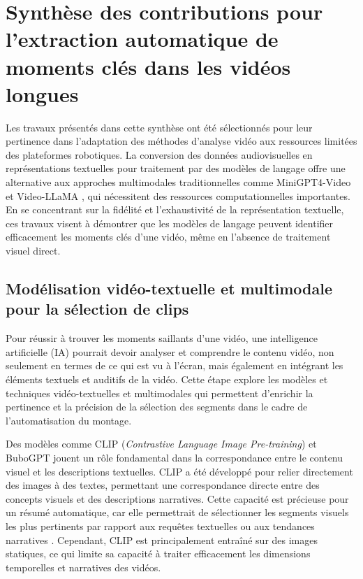 \chapter{Synthèse des contributions pour l’extraction automatique de moments clés dans les vidéos longues}


Les travaux présentés dans cette synthèse ont été sélectionnés pour leur pertinence dans l'adaptation des méthodes d'analyse vidéo aux ressources limitées des plateformes robotiques. La conversion des données audiovisuelles en représentations textuelles pour traitement par des modèles de langage offre une alternative aux approches multimodales traditionnelles comme MiniGPT4-Video \cite{ataallah2024minigpt4video} et Video-LLaMA \cite{anonymous2023_videollama}, qui nécessitent des ressources computationnelles importantes. En se concentrant sur la fidélité et l'exhaustivité de la représentation textuelle, ces travaux visent à démontrer que les modèles de langage peuvent identifier efficacement les moments clés d'une vidéo, même en l'absence de traitement visuel direct.

\section{Modélisation vidéo-textuelle et multimodale pour la sélection de clips}

Pour réussir à trouver les moments saillants d’une vidéo, une intelligence artificielle (IA) pourrait devoir analyser et comprendre le contenu vidéo, non seulement en termes de ce qui est vu à l’écran, mais également en intégrant les éléments textuels et auditifs de la vidéo. Cette étape explore les modèles et techniques vidéo-textuelles et multimodales qui permettent d’enrichir la pertinence et la précision de la sélection des segments dans le cadre de l’automatisation du montage. 

Des modèles comme CLIP \cite{bain2022}(\textit{Contrastive Language Image Pre-training}) et BuboGPT \cite{anonymous2023_bubogpt} jouent un rôle fondamental dans la correspondance entre le contenu visuel et les descriptions textuelles. CLIP a été développé pour relier directement des images à des textes, permettant une correspondance directe entre des concepts visuels et des descriptions narratives. Cette capacité est précieuse pour un résumé automatique, car elle permettrait de sélectionner les segments visuels les plus pertinents par rapport aux requêtes textuelles ou aux tendances narratives \cite{chen2023}\cite{ghosh2019_excl}. Cependant, CLIP est principalement entraîné sur des images statiques, ce qui limite sa capacité à traiter efficacement les dimensions temporelles et narratives des vidéos.


